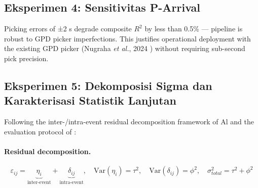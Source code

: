 \documentclass[10pt]{article}
\renewcommand{\cite}[1]{\citep{#1}}
\newcommand{\etal}{\textit{et al.}}
\begin{document}
\subsection{Eksperimen 4: Sensitivitas P-Arrival}

Picking errors of ±2 s degrade composite \(R^2\) by less than 0.5\% --- pipeline is robust to GPD picker imperfections. This justifies operational deployment with the existing GPD picker (Nugraha \etal{}, 2024 \cite{ref81}) without requiring sub-second pick precision.

\subsection{Eksperimen 5: Dekomposisi Sigma dan Karakterisasi Statistik Lanjutan}

Following the inter-/intra-event residual decomposition framework of Al \citet{ref44} and the evaluation protocol of \citet{ref35}:

\paragraph{Residual decomposition.}

\[\varepsilon_{ij} = \underbrace{\eta_i}_{\text{inter-event}} + \underbrace{\delta_{ij}}_{\text{intra-event}}, \quad \text{Var}(\eta_i) = \tau^2, \quad \text{Var}(\delta_{ij}) = \phi^2, \quad \sigma_{total}^2 = \tau^2 + \phi^2\]
\end{document}
